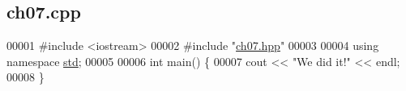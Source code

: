 \hypertarget{ch07_8cpp_source}{}\subsection{ch07.\+cpp}

\begin{DoxyCode}
00001 \textcolor{preprocessor}{#include <iostream>}
00002 \textcolor{preprocessor}{#include "\mbox{\hyperlink{ch07_8hpp}{ch07.hpp}}"}
00003 
00004 \textcolor{keyword}{using namespace }\mbox{\hyperlink{namespacestd}{std}};
00005 
00006 \textcolor{keywordtype}{int} main() \{
00007   cout << \textcolor{stringliteral}{"We did it!"} << endl;
00008 \}
\end{DoxyCode}
